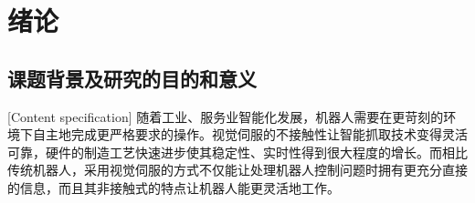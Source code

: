 \documentclass[fontset=fandol,type=bachelor,campus=harbin,bsmainpagenumberline=true]{hithesisbook}
\begin{document}
\frontmatter
\makecover
\tableofcontents %
\mainmatter
%













\chapter[绪论]{绪论}
\section{课题背景及研究的目的和意义}[Content specification]
随着工业、服务业智能化发展，机器人需要在更苛刻的环境下自主地完成更严格要求的操作。视觉伺服的不接触性让智能抓取技术变得灵活可靠，硬件的制造工艺快速进步使其稳定性、实时性得到很大程度的增长。而相比传统机器人，采用视觉伺服的方式不仅能让处理机器人控制问题时拥有更充分直接的信息，而且其非接触式的特点让机器人能更灵活地工作\cite{徐鑫莉2015工业机器人视觉伺服控制系统设计,陶波2016机器人无标定视觉伺服控制研究进展}。
\end{document}
